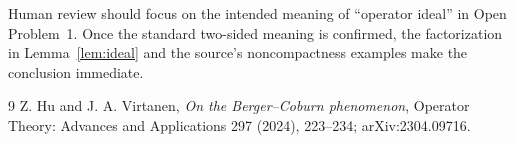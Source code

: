 \documentclass[11pt]{article}
\begin{document}
Human review should focus on the intended meaning of ``operator ideal'' in
Open Problem~1.  Once the standard two-sided meaning is confirmed, the
factorization in Lemma~\ref{lem:ideal} and the source's noncompactness examples
make the conclusion immediate.

\begin{thebibliography}{9}
Z. Hu and J. A. Virtanen,
\emph{On the Berger--Coburn phenomenon},
Operator Theory: Advances and Applications 297 (2024), 223--234;
arXiv:2304.09716.
\end{thebibliography}
\end{document}
